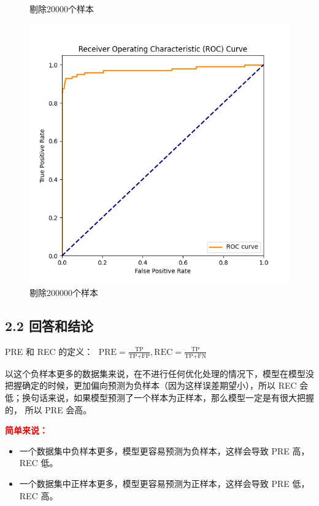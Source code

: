 \documentclass[8pt]{article}
\begin{document}
\begin{figure}[H]
\begin{minipage}{0.24\textwidth}
        \caption{剔除20000个样本}
        \label{fig:roc_curve_remove20000}
    \end{minipage}
    \hfill
    \begin{minipage}{0.24\textwidth}
        \centering
        \includegraphics[width=\textwidth]{../Prob1/out/rand_seed_14/task2/roc_curve_remove200000.png}
        \caption{剔除200000个样本}
        \label{fig:roc_curve_remove200000}
    \end{minipage}
    \hfill
\end{figure}

\subsection*{2.2 回答和结论}

PRE 和 REC 的定义：
\(      \text{ \ \ PRE} = \frac{\text{TP}}{\text{TP+FP}}, 
        \text{REC} = \frac{\text{TP}}{\text{TP+FN}}
\)

以这个负样本更多的数据集来说，在不进行任何优化处理的情况下，模型在模型没把握确定的时候，更加偏向预测为负样本（因为这样误差期望小），所以 REC 会低；换句话来说，如果模型预测了一个样本为正样本，那么模型一定是有很大把握的， 所以 PRE 会高。

\textbf{\textcolor{red}{简单来说：}}
\begin{itemize}
    \item 一个数据集中负样本更多，模型更容易预测为负样本，这样会导致 PRE 高，REC 低。
    \item 一个数据集中正样本更多，模型更容易预测为正样本，这样会导致 PRE 低，REC 高。
\end{itemize}
\end{document}
